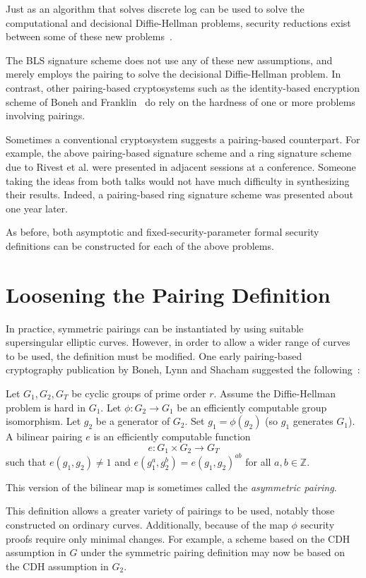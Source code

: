 Just as an algorithm that solves discrete log can be used to solve
the computational and decisional Diffie-Hellman problems, security reductions
exist between some of these new problems~\cite{jouxsurvey}.

The BLS signature scheme does not use any of these new assumptions,
and merely employs the pairing to solve the decisional Diffie-Hellman problem.
In contrast, other pairing-based cryptosystems such as the identity-based
encryption scheme of Boneh and Franklin~\cite{bf} do rely on the hardness
of one or more problems involving pairings.

Sometimes a conventional cryptosystem suggests
a pairing-based counterpart. For example,
the above pairing-based signature scheme and a ring signature scheme
due to Rivest et al. \cite{rst} were presented in adjacent sessions
at a conference. Someone taking the ideas from both talks would not have much
difficulty in synthesizing their results. Indeed,
a pairing-based ring signature scheme was presented about one
year later\cite{bgls}.

As before, both asymptotic and fixed-security-parameter formal security
definitions can be constructed for each of the above problems.

\section{\label{sec:asymmetricpairing}Loosening the Pairing Definition}

In practice, symmetric pairings can be instantiated by
using suitable supersingular elliptic curves.
However, in order to allow a wider range of curves to be used,
the definition must be modified. One early pairing-based cryptography
publication by Boneh, Lynn and Shacham
suggested the following~\cite{bls}:

Let $G_1, G_2, G_T$ be cyclic groups of prime order $r$.
Assume the Diffie-Hellman problem is hard in $G_1$.
Let $\phi : G_2 \rightarrow G_1$ be an efficiently computable group
isomorphism. Let $g_2$ be a generator of $G_2$.
Set $g_1 = \phi(g_2)$ (so $g_1$ generates $G_1$). 
A bilinear pairing $e$ is an efficiently computable function
\[
e:G_1 \times G_2 \rightarrow G_T
\]
such that $e(g_1,g_2) \ne 1$ and
$e(g_1^a, g_2^b) = e(g_1,g_2)^{a b}$ for all $a, b \in \mathbb{Z}$.

This version of the bilinear map is sometimes called
the \emph{asymmetric pairing}.

This definition allows a greater variety of pairings to be used,
notably those constructed on ordinary curves.
Additionally, because of the map $\phi$ security proofs
require only minimal changes. For example,
a scheme based on the CDH assumption in $G$ under
the symmetric pairing definition may now be based on the CDH assumption in
$G_2$.


